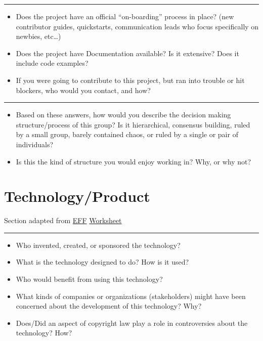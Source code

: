 \begin{center}\rule{3in}{0.4pt}\end{center}

\begin{itemize}
\itemsep1pt\parskip0pt
\item
  Does the project have an official ``on-boarding'' process in place?
  (new contributor guides, quickstarts, communication leads who focus
  specifically on newbies, etc\ldots{})
\item
  Does the project have Documentation available? Is it extensive? Does
  it include code examples?
\item
  If you were going to contribute to this project, but ran into trouble
  or hit blockers, who would you contact, and how?
\end{itemize}

\begin{center}\rule{3in}{0.4pt}\end{center}

\begin{itemize}
\itemsep1pt\parskip0pt
\item
  Based on these answers, how would you describe the decision making
  structure/process of this group? Is it hierarchical, consensus
  building, ruled by a small group, barely contained chaos, or ruled by
  a single or pair of individuals?
\item
  Is this the kind of structure you would enjoy working in? Why, or why
  not?
\end{itemize}

\section{Technology/Product}\label{technologyproduct}

Section adapted from \url{EFF}
\href{http://www.teachingcopyright.org/handout/technology-history-worksheet}{Worksheet}

\begin{center}\rule{3in}{0.4pt}\end{center}

\begin{itemize}
\itemsep1pt\parskip0pt
\item
  Who invented, created, or sponsored the technology?
\item
  What is the technology designed to do? How is it used?
\item
  Who would benefit from using this technology?
\item
  What kinds of companies or organizations (stakeholders) might have
  been concerned about the development of this technology? Why?
\item
  Does/Did an aspect of copyright law play a role in controversies about
  the technology? How?
\end{itemize}

